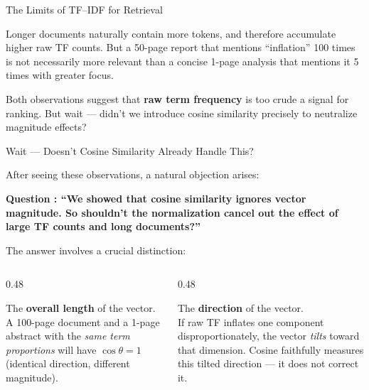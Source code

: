 \documentclass[aspectratio=169]{beamer}
\begin{document}
%
%
\begin{frame}{The Limits of TF--IDF for Retrieval}

\begin{tcolorbox}[colback=red!5!white, colframe=red!70!black,
  title=\textbf{Observation 2 --- Document length skews results}]
Longer documents naturally contain more tokens,
and therefore accumulate higher raw TF counts.
But a 50-page report that mentions ``inflation'' 100 times
is not necessarily more relevant than a concise 1-page analysis
that mentions it 5 times with greater focus.
\end{tcolorbox}

\medskip

Both observations suggest that \textbf{raw term frequency}
is too crude a signal for ranking.
But wait --- didn't we introduce cosine similarity
precisely to neutralize magnitude effects?

\end{frame}
%
%
\begin{frame}{Wait --- Doesn't Cosine Similarity Already Handle This?}

After seeing these observations, a natural objection arises:

\vspace{0.3cm}
\textbf{Question :  ``We showed that cosine similarity ignores vector magnitude. So shouldn't the normalization cancel out the effect of large TF counts and long documents?''}

\vspace{0.3cm}
The answer involves a crucial distinction:

\begin{columns}[T]
\begin{column}{0.48\textwidth}
\begin{tcolorbox}[colback=green!5!white, colframe=green!60!black,
  title=\textbf{What cosine fixes}]
The \textbf{overall length} of the vector.\\[4pt]
A 100-page document and a 1-page abstract
with the \emph{same term proportions}
will have $\cos\theta = 1$
(identical direction, different magnitude).
\end{tcolorbox}
\end{column}

\begin{column}{0.48\textwidth}
\begin{tcolorbox}[colback=red!5!white, colframe=red!70!black,
  title=\textbf{What cosine does NOT fix}]
The \textbf{direction} of the vector.\\[4pt]
If raw TF inflates one component
disproportionately, the vector \emph{tilts}
toward that dimension.
Cosine faithfully measures this tilted direction
--- it does not correct it.
\end{tcolorbox}
\end{column}
\end{columns}
\end{frame}
\end{document}
